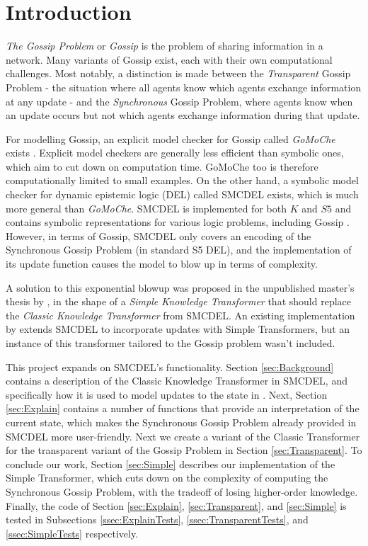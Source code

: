 \section{Introduction}

\textit{The Gossip Problem} or \textit{Gossip} is the problem of sharing information in a network. 
Many variants of Gossip exist, each with their own computational challenges. 
Most notably, a distinction is made between the \textit{Transparent} Gossip Problem - the situation where all agents know 
which agents exchange information at any update - and the \textit{Synchronous} Gossip Problem, where agents know when an 
update occurs but not which agents exchange information during that update.

For modelling Gossip, an explicit model checker for Gossip called \textit{GoMoChe} exists \cite{gattinger2023gomoche}. 
Explicit model checkers are generally less efficient than symbolic ones, which aim to cut down on computation time. 
GoMoChe too is therefore computationally limited to small examples. On the other hand, 
a symbolic model checker for dynamic epistemic logic (DEL) called SMCDEL exists, which is much more general than \textit{GoMoChe}. 
SMCDEL is implemented for
both $K$ and $S5$ and contains symbolic representations for various logic problems, including Gossip \cite{GattingerThesis2018}. 
However, in terms of Gossip, SMCDEL only covers an encoding of the Synchronous Gossip 
Problem (in standard S5 DEL), and the implementation of its update function causes the model to blow up in terms of 
complexity.

A solution to this exponential blowup was proposed in the unpublished master's thesis by \cite{danielMasterThesis}, in the shape 
of a \textit{Simple Knowledge Transformer} that should replace the \textit{Classic Knowledge Transformer} from SMCDEL. An existing 
implementation by \cite{HaitianHanabi} extends SMCDEL to incorporate updates with Simple Transformers, but an instance of this transformer
tailored to the Gossip problem wasn't included. 

This project expands on SMCDEL's functionality. Section \ref{sec:Background} contains a description of 
the Classic Knowledge Transformer in SMCDEL, and 
specifically how it is used to model updates to the state in \cite{GattingerThesis2018}. 
Next, Section \ref{sec:Explain} contains a number of functions that provide an interpretation of the current state, 
which makes the Synchronous Gossip Problem already provided in SMCDEL more user-friendly. 
Next we create a variant of the Classic Transformer for the transparent variant of the Gossip Problem in Section \ref{sec:Transparent}. 
To conclude our work, Section \ref{sec:Simple} describes our implementation of the Simple Transformer, 
which cuts down on the complexity of computing the Synchronous Gossip Problem, with the tradeoff of losing higher-order knowledge. 
Finally, the code of Section \ref{sec:Explain}, \ref{sec:Transparent}, and \ref{sec:Simple} is tested in Subsections \ref{ssec:ExplainTests}, 
\ref{ssec:TransparentTests}, and \ref{ssec:SimpleTests} respectively.

